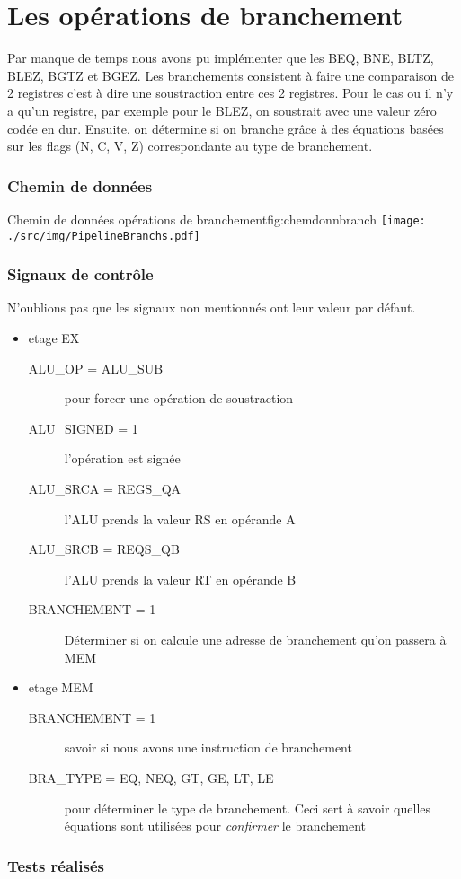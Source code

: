 \section{Les opérations de branchement}
Par manque de temps nous avons pu implémenter que les BEQ, BNE, BLTZ, BLEZ, BGTZ et BGEZ.
Les branchements consistent à faire une comparaison de 2 registres c'est à dire une soustraction entre ces 2 registres.
Pour le cas ou il n'y a qu'un registre, par exemple pour le BLEZ, on soustrait avec une valeur zéro codée en dur.
Ensuite, on détermine si on branche grâce à des équations basées sur les flags (N, C, V, Z) correspondante au type de branchement.

\subsubsection{Chemin de données}
\begin{figureGraphics}{Chemin de données opérations de branchement}{fig:chemdonnbranch}
  \centering
  \texttt{[image: ./src/img/PipelineBranchs.pdf]}
\end{figureGraphics}
\subsubsection{Signaux de contrôle}
N’oublions pas que les signaux non mentionnés ont leur valeur par défaut.
\begin{itemize}
  \item etage EX
    \begin{description}
      \item[ALU\_OP = ALU\_SUB] pour forcer une opération de soustraction
      \item[ALU\_SIGNED = 1] l’opération est signée
      \item[ALU\_SRCA = REGS\_QA] l’ALU prends la valeur RS en opérande A
      \item[ALU\_SRCB = REQS\_QB] l’ALU prends la valeur RT en opérande B
      \item[BRANCHEMENT = 1] Déterminer si on calcule une adresse de branchement qu'on passera à MEM
    \end{description}
  \item etage MEM
    \begin{description}
      \item[BRANCHEMENT = 1] savoir si nous avons une instruction de branchement
      \item[BRA\_TYPE = EQ, NEQ, GT, GE, LT, LE] pour déterminer le type de branchement. Ceci sert à savoir quelles équations sont utilisées pour \emph{confirmer} le branchement
    \end{description}
\end{itemize}
\subsubsection{Tests réalisés}



